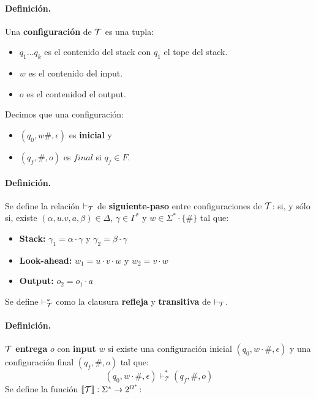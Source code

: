     \paragraph{Definición.} Una \textbf{configuración} de $\mathcal{T}$ es una tupla:
    \begin{itemize}
        \item $q_1\ldots q_k$ es el contenido del stack con $q_1$ el tope del stack.
        \item $w$ es el contenido del input.
        \item $o$ es el contenidod el output.
    \end{itemize}
    Decimos que una configuración:
    \begin{itemize}
        \item $(q_0, w\#, \epsilon)$ es \textbf{inicial} y
        \item $(q_f, \#, o)$ es $final$ si $q_f \in F$.
    \end{itemize}

    \paragraph{Definición.} Se define la relación $\vdash_{\mathcal{T}}$ de \textbf{siguiente-paso} entre configuraciones de $\mathcal{T}$:
    si, y sólo si, existe $(\alpha,u.v,a,\beta) \in \Delta$, $\gamma \in \Gamma^*$ y $w \in \Sigma^* \cdot \{\#\}$ tal que:
    \begin{itemize}
        \item \textbf{Stack:} $\gamma_1 = \alpha \cdot \gamma$ y $\gamma_2 = \beta \cdot \gamma$
        \item \textbf{Look-ahead:} $w_1 = u \cdot v \cdot w$ y $w_2 = v \cdot w$
        \item \textbf{Output:} $o_2 = o_1 \cdot a$
    \end{itemize}
    Se define $\vdash_{\mathcal{T}}^*$ como la clausura \textbf{refleja} y \textbf{transitiva} de $\vdash_{\mathcal{T}}$.

    \paragraph{Definición.} $\mathcal{T}$ \textbf{entrega} $o$ con \textbf{input} $w$ si existe una configuración inicial $(q_0, w\cdot \#, \epsilon)$ y una configuración final $(q_f, \#, o)$ tal que:
    $$
        \left(q_0, w \cdot \#, \epsilon\right) \vdash_{\mathcal{T}}^*\left(q_f, \#, o\right)
    $$
    Se define la función $\llbracket \mathcal{T} \rrbracket: \Sigma^* \to 2^{\Omega^*}$:

